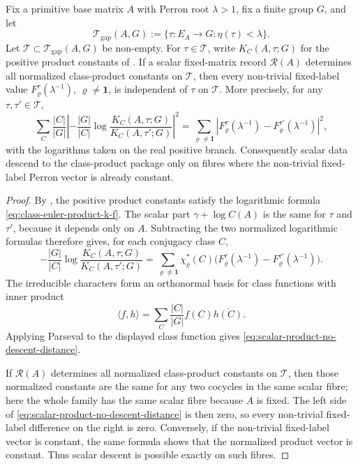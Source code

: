 \begin{theorem}
  \label{thm:scalar-class-product-no-descent}
  Fix a primitive base matrix \(A\) with Perron root \(\lambda>1\), fix a finite
  group \(G\), and let
  \[
    \mathcal T_{\mathrm{gap}}(A,G)
    :=\{\tau:E_A\to G:\eta(\tau)<\lambda\}.
  \]
  Let \(\mathscr T\subset\mathcal T_{\mathrm{gap}}(A,G)\) be non-empty.  For
  \(\tau\in\mathscr T\), write \(K_C(A,\tau;G)\) for the positive product
  constants of .  If a scalar
  fixed-matrix record \(\mathcal R(A)\) determines all normalized class-product
  constants on \(\mathscr T\), then every non-trivial fixed-label value
  \(F_\varrho^\tau(\lambda^{-1})\), \(\varrho\ne\mathbf1\), is independent of
  \(\tau\) on \(\mathscr T\).  More precisely, for any
  \(\tau,\tau'\in\mathscr T\),
  \begin{equation}\label{eq:scalar-product-no-descent-distance}
    \sum_C\frac{|C|}{|G|}
      \left|
        -\frac{|G|}{|C|}
        \log\frac{K_C(A,\tau;G)}{K_C(A,\tau';G)}
      \right|^2
    =
    \sum_{\varrho\ne\mathbf1}
      \left|
        F_\varrho^\tau(\lambda^{-1})
        -F_\varrho^{\tau'}(\lambda^{-1})
      \right|^2,
  \end{equation}
  with the logarithms taken on the real positive branch.  Consequently scalar
  data descend to the class-product package only on fibres where the
  non-trivial fixed-label Perron vector is already constant.
\end{theorem}

\begin{proof}
  By , the positive product constants
  satisfy the logarithmic formula \eqref{eq:class-euler-product-k-f}.  The
  scalar part \(\gamma+\log C(A)\) is the same for \(\tau\) and \(\tau'\),
  because it depends only on \(A\).  Subtracting the two normalized logarithmic
  formulas therefore gives, for each conjugacy class \(C\),
  \[
    -\frac{|G|}{|C|}
    \log\frac{K_C(A,\tau;G)}{K_C(A,\tau';G)}
    =
      \sum_{\varrho\ne\mathbf1}
        \chi_\varrho^\ast(C)
        \bigl(
          F_\varrho^\tau(\lambda^{-1})
          -F_\varrho^{\tau'}(\lambda^{-1})
        \bigr).
  \]
  The irreducible characters form an orthonormal basis for class functions with
  inner product
  \[
    \langle f,h\rangle=\sum_C\frac{|C|}{|G|}f(C)\overline{h(C)}.
  \]
  Applying Parseval to the displayed class function gives
  \eqref{eq:scalar-product-no-descent-distance}.

  If \(\mathcal R(A)\) determines all normalized class-product constants on
  \(\mathscr T\), then those normalized constants are the same for any two
  cocycles in the same scalar fibre; here the whole family has the same scalar
  fibre because \(A\) is fixed.  The left side of
  \eqref{eq:scalar-product-no-descent-distance} is then zero, so every
  non-trivial fixed-label difference on the right is zero.  Conversely, if the
  non-trivial fixed-label vector is constant, the same formula shows that the
  normalized product vector is constant.  Thus scalar descent is possible
  exactly on such fibres.
\end{proof}

